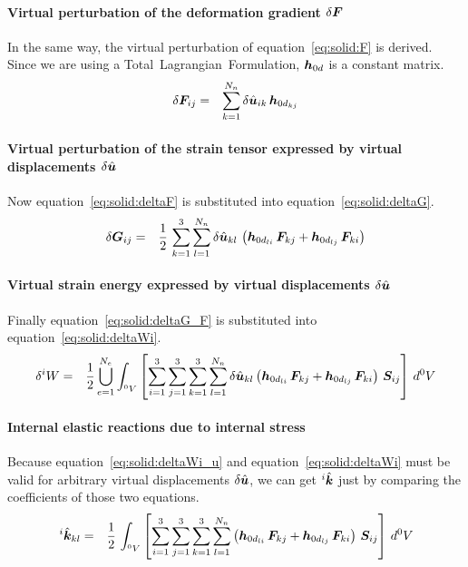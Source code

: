 \paragraph{Virtual perturbation of the deformation gradient $\delta\bm{F}$}
In the same way, the virtual perturbation of equation~\ref{eq:solid:F} is derived.
Since we are using a Total~Lagrangian~Formulation, $\bm{h}_{0d}$ is a constant matrix.
\begin{eqnarray}
\delta \bm{F}_{ij} & = & \sum_{k=1}^{N_n} \delta \hat{\bm{u}}_{ik} \, \bm{h}_{0d_{kj}} \label{eq:solid:deltaF}
\end{eqnarray}

\paragraph{Virtual perturbation of the strain tensor expressed by virtual displacements $\delta{\hat{\bm{u}}}$}
Now equation~\ref{eq:solid:deltaF} is substituted into equation~\ref{eq:solid:deltaG}.
\begin{eqnarray}
\delta \bm{G}_{ij} & = & \frac{1}{2} \, \sum_{k=1}^3 \sum_{l=1}^{N_n} \delta \hat{\bm{u}}_{kl} \, \left( \bm{h}_{0d_{li}} \, \bm{F}_{kj} + \bm{h}_{0d_{lj}} \, \bm{F}_{ki} \right) \label{eq:solid:deltaG_F}
\end{eqnarray}

\paragraph{Virtual strain energy expressed by virtual displacements $\delta{\hat{\bm{u}}}$}
Finally equation~\ref{eq:solid:deltaG_F} is substituted into equation~\ref{eq:solid:deltaWi}.
\begin{eqnarray}
\delta ^iW & = & \frac{1}{2} \bigcup_{e=1}^{N_e} \int_{^0V} \left[ \sum_{i=1}^3 \sum_{j=1}^3 \sum_{k=1}^3 \sum_{l=1}^{N_n} \delta \hat{\bm{u}}_{kl}\left(\bm{h}_{0d_{li}} \, \bm{F}_{kj} + \bm{h}_{0d_{lj}} \, \bm{F}_{ki}\right) \, \bm{S}_{ij} \right] \, d^0V \label{eq:solid:deltaWi_u}
\end{eqnarray}

\paragraph{Internal elastic reactions due to internal stress}
Because equation~\ref{eq:solid:deltaWi_u} and equation~\ref{eq:solid:deltaWi} must be valid for arbitrary virtual displacements $\delta\hat{\bm{u}}$, we can get $^i\hat{\bm{k}}$ just by comparing the coefficients of those two equations.
\begin{eqnarray}
^i\hat{\bm{k}}_{kl} & = & \frac{1}{2} \, \int_{^0V} \left[ \sum_{i=1}^3 \sum_{j=1}^3 \sum_{k=1}^3 \sum_{l=1}^{N_n} \left(\bm{h}_{0d_{li}} \, \bm{F}_{kj} + \bm{h}_{0d_{lj}} \, \bm{F}_{ki}\right) \, \bm{S}_{ij} \right] \, d^0V
\end{eqnarray}

